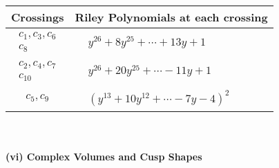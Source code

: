\documentclass[1p]{elsarticle_modified}
\theoremstyle{definition}
\begin{document}
\begin{tabular}{m{50pt}|m{274pt}}
Crossings & \hspace{64pt}Riley Polynomials at each crossing \\
\hline $$\begin{aligned}c_{1},c_{3},c_{6}\\c_{8}\end{aligned}$$&$\begin{aligned}
&y^{26}+8 y^{25}+\cdots+13 y+1
\end{aligned}$\\
\hline $$\begin{aligned}c_{2},c_{4},c_{7}\\c_{10}\end{aligned}$$&$\begin{aligned}
&y^{26}+20 y^{25}+\cdots-11 y+1
\end{aligned}$\\
\hline $$\begin{aligned}c_{5},c_{9}\end{aligned}$$&$\begin{aligned}
&(y^{13}+10 y^{12}+\cdots-7 y-4)^{2}
\end{aligned}$\\
\hline
\end{tabular}\\~\\
\newpage\flushleft \textbf{(vi) Complex Volumes and Cusp Shapes}
\end{document}
